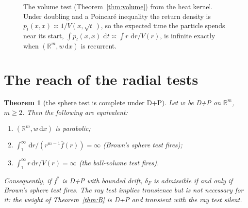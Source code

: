 \documentclass[11pt]{amsart}
\newcommand{\R}{\mathbb{R}}
\newcommand{\dd}{\,\mathrm{d}}
\newcommand{\fbar}{\bar f}
\theoremstyle{plain}
\newtheorem{theorem}{Theorem}[section]
\theoremstyle{definition}
\theoremstyle{remark}
\begin{document}
\begin{figure}[t]
\centering
{}
\caption{The volume test (Theorem~\ref{thm:volume}) from the heat kernel. Under
doubling and a Poincar\'e inequality the return density is
$p_t(x,x)\asymp1/V(x,\sqrt t\,)$, so the expected time the particle spends near
its start, $\int p_t(x,x)\,\dd t\asymp\int r\,\dd r/V(r)$, is infinite exactly
when $(\R^m,w\dd x)$ is recurrent.}
\label{fig:heatkernel}
\end{figure}

\section{The reach of the radial tests}\label{sec:reach}

\begin{theorem}[the sphere test is complete under D+P]\label{thm:A}
Let $w$ be D+P on $\R^m$, $m\ge2$. Then the following are equivalent:
\begin{enumerate}[label=\textup{(\roman*)},leftmargin=2em,itemsep=1pt]
\item $(\R^m,w\dd x)$ is parabolic;
\item $\int_1^\infty\dd r/(r^{m-1}\fbar(r))=\infty$ (Brown's sphere test fires);
\item $\int_1^\infty r\dd r/V(r)=\infty$ (the ball-volume test fires).
\end{enumerate}
Consequently, if $f^*$ is D+P with bounded drift, $\delta_F$ is admissible if
and only if Brown's sphere test fires. The ray test implies transience but is
not necessary for it: the weight of Theorem~\ref{thm:B} is D+P and transient
with the ray test silent.
\end{theorem}
\end{document}
